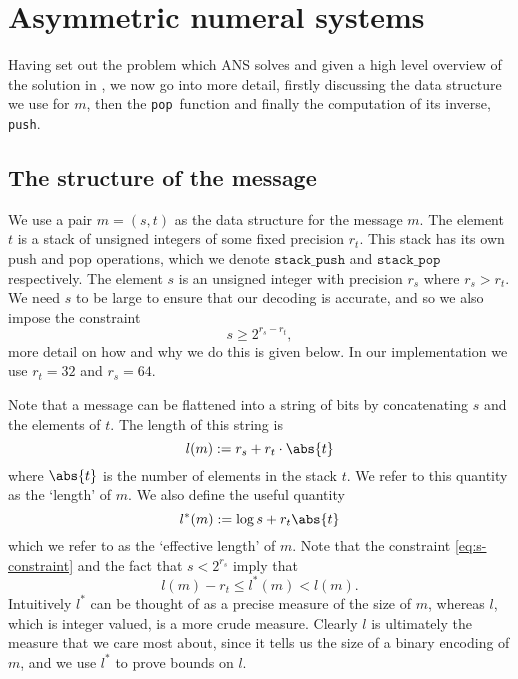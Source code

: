 \documentclass{article}
\theoremstyle{definition}
\newcommand{\push}{\texttt{push}}
\newcommand{\pop}{\texttt{pop}}
\begin{document}
\section{Asymmetric numeral systems}
  Having set out the problem which ANS solves and given a high level overview
  of the solution in , we now go into more detail, firstly
  discussing the data structure we use for \(m\), then the \pop\ function and
  finally the computation of its inverse, \push.


\subsection{The structure of the message}\label{sec:message}
  We use a pair \(m = (s, t)\) as the data structure for the message \(m\). The
  element \(t\) is a stack of unsigned integers of some fixed precision
  \(r_t\).  This stack has its own push and pop operations, which we denote
  \(\texttt{stack\_push}\) and \(\texttt{stack\_pop}\) respectively. The
  element \(s\) is an unsigned integer with precision \(r_s\) where \(r_s >
  r_t\). We need \(s\) to be large to ensure that our decoding is accurate, and
  so we also impose the constraint
  \begin{equation}\label{eq:s-constraint}
    s\geq2^{r_s - r_t},
  \end{equation}
  more detail on how and why we do this is given below. In our implementation
  we use \(r_t = 32\) and \(r_s = 64\).

  Note that a message can be flattened into a string of bits by concatenating
  \(s\) and the elements of \(t\). The length of this string is
  \begin{equation}
    l(m) := r_s + r_t\cdot\abs{t}
  \end{equation}
  where \(\abs{t}\) is the number of elements in the stack \(t\). We refer to
  this quantity as the `length' of \(m\). We also define the useful quantity
  \begin{equation}
    l^*(m) := \log s + r_t\abs{t}
  \end{equation}
  which we refer to as the `effective length' of \(m\). Note that the
  constraint \cref{eq:s-constraint} and the fact that \(s < 2^{r_s}\) imply
  that
  \begin{equation}
    l(m) - r_t \leq l^*(m) < l(m).
  \end{equation}
  Intuitively \(l^*\) can be thought of as a precise measure of the size of
  \(m\), whereas \(l\), which is integer valued, is a more crude measure.
  Clearly \(l\) is ultimately the measure that we care most about, since it
  tells us the size of a binary encoding of \(m\), and we use \(l^*\) to prove
  bounds on \(l\).
\end{document}
